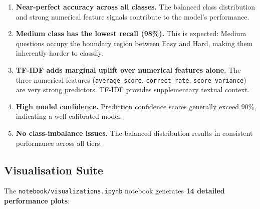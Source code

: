 \documentclass[12pt, a4paper, twoside]{article}
\newcommand{\code}[1]{\texttt{#1}}
\begin{document}
\begin{enumerate}[leftmargin=2em]
    \item \textbf{Near-perfect accuracy across all classes.} The
          balanced class distribution and strong numerical feature
          signals contribute to the model's performance.

    \item \textbf{Medium class has the lowest recall (98\%).} This is
          expected: Medium questions occupy the boundary region between
          Easy and Hard, making them inherently harder to classify.

    \item \textbf{TF-IDF adds marginal uplift over numerical features
          alone.} The three numerical features
          (\code{average\_score}, \code{correct\_rate},
          \code{score\_variance}) are very strong predictors. TF-IDF
          provides supplementary textual context.

    \item \textbf{High model confidence.} Prediction confidence scores
          generally exceed 90\%, indicating a well-calibrated model.

    \item \textbf{No class-imbalance issues.} The balanced distribution
          results in consistent performance across all tiers.
\end{enumerate}

\subsection{Visualisation Suite}

The \code{notebook/visualizations.ipynb} notebook generates
\textbf{14 detailed performance plots}:
\end{document}
